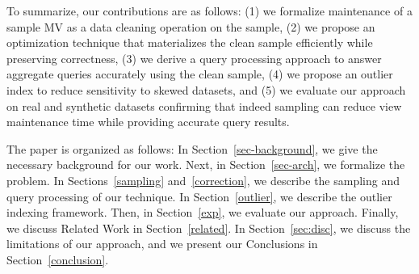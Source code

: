 
To summarize, our contributions are as follows: (1) we formalize maintenance of a sample MV as a data cleaning operation on the sample, (2) we propose an optimization technique that materializes the clean sample efficiently while preserving correctness, (3) we derive a query processing approach to answer aggregate queries accurately using the clean sample, (4) we propose an outlier index to reduce sensitivity to skewed datasets, and (5) we evaluate our approach on real and synthetic datasets confirming that indeed sampling can reduce view maintenance time while providing accurate query results. 

The paper is organized as follows: 
In Section~\ref{sec-background}, we give the necessary background for our work.
Next, in Section~\ref{sec-arch}, we formalize the problem.
In Sections~\ref{sampling} and~\ref{correction}, we describe the sampling and query processing of our technique.
In Section~\ref{outlier}, we describe the outlier indexing framework.
Then, in Section~\ref{exp}, we evaluate our approach.
Finally, we discuss Related Work in Section~\ref{related}.
In Section~\ref{sec:disc}, we discuss the limitations of our approach, and we present our Conclusions in Section~\ref{conclusion}.

